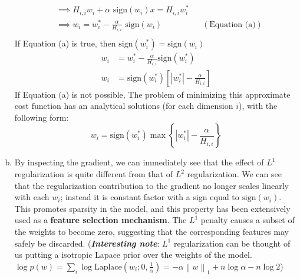 \documentclass[fleqn]{article}
\newcommand{\norm}[1]{\left\lVert#1\right\rVert} %
\begin{document}
\begin{enumerate}[a)]
\begin{align*}
	&\implies H_{i, i} w_i + \alpha \text{ sign}(w_i)x = H_{i, i} w_i^*\\
	&\implies w_i = w_i^* - \frac{\alpha}{H_{i, i}} \text{ sign}(w_i) && (\text{Equation (a)})\\
	\end{align*}
	If Equation (a) is true, then $\text{sign}(w_i^*) = \text{sign}(w_i)$
	\begin{align*}
		w_i &= w_i^* - \frac{\alpha}{H_{i, i}} \text{sign}(w_i^*)\\
		w_i &= \text{sign}(w_i^*) \left[|w_i^*| - \frac{\alpha}{H_{i, i}}\right]
	\end{align*}
	If Equation (a) is not possible, 
	The problem of minimizing this approximate cost function has an analytical solutions (for each dimension $i$), with the following form:
	$$w_i = \text{sign}(w_i^*) \max \left\{ | w_i^*| - \frac{\alpha}{H_{i, i}}\right\}$$
	
	\item
	 By inspecting the gradient, we can immediately see that the effect of $L^1$ regularization is quite different from that of $L^2$ regularization. We can see that the regularization contribution to the gradient no longer scales linearly with each $w_i$; instead it is constant factor with a sign equal to $\text{sign}(w_i)$. This promotes sparsity in the model, and this property has been extensively used as a \textbf{feature selection mechanism}. The $L^1$ penalty causes a subset of the weights to become zero, suggesting that the corresponding features may safely be discarded. 
	 (\textit{\textbf{Interesting note}}: $L^1$ regularization can be thought of us putting a isotropic Lapace prior over the weights of the model. $\log p(w) = \sum_i \log \text{Laplace}\left(w_i; 0, \frac{1}{\alpha}\right) = -\alpha \norm{w}_1 + n\log \alpha - n \log 2$)

\end{enumerate}
\end{document}

